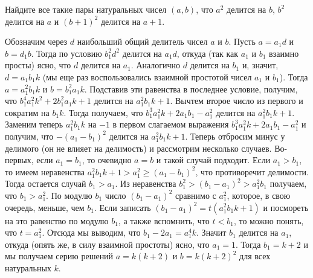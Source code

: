 Найдите все такие пары натуральных чисел $(a, b)$, что
$a^2$ делится на $b$,
$b^2$ делится на $a$
и $(b + 1)^2$ делится на $a + 1$.

\solution
Обозначим через $d$ наибольший общий делитель чисел $a$ и $b$.
Пусть $a = a_1 d$ и $b = d_1 b$.
Тогда по условию $b_1^2 d^2$ делится на $a_1 d$, откуда
(так как $a_1$ и $b_1$ взаимно просты)
ясно, что $d$ делится на $a_1$.
Аналогично $d$ делится на $b_1$ и, значит, $d = a_1 b_1 k$
(мы еще раз воспользовались взаимной простотой чисел $a_1$ и $b_1$).
Тогда $a = a_1^2 b_1 k$ и $b = b_1^2 a_1 k$.
Подставив эти равенства в последнее условие, получим, что
$b_1^4 a_1^2 k^2 + 2 b_1^2 a_1 k + 1$
делится на $a_1^2 b_1 k + 1$.
Вычтем второе число из первого и сократим на $b_1 k$.
Тогда получаем, что
$b_1^3 a_1^2 k + 2 a_1 b_1 - a_1^2$
делится на $a_1^2 b_1 k + 1$.
Заменим теперь $a_1^2 b_1 k$ на $-1$ в первом слагаемом выражения
$b_1^3 a_1^2 k + 2 a_1 b_1 - a_1^2$ и получим, что $-(a_1 - b_1)^2$ делится на
$a_1^2 b_1 k + 1$.
Теперь отбросим минус у делимого (он не влияет на делимость) и рассмотрим
несколько случаев.
Во-первых, если $a_1 = b_1$, то очевидно $a = b$ и такой случай подходит.
Если $a_1 > b_1$, то имеем неравенства
$a_1^2 b_1 k + 1 > a_1^2 \geq (a_1 - b_1)^2$,
что противоречит делимости.
Тогда остается случай $b_1 > a_1$.
Из неравенства
$b_1^2 > (b_1 - a_1)^2 > a_1^2 b_1$
получаем, что $b_1 > a_1^2$.
По модулю $b_1$ число $(b_1 - a_1)^2$ сравнимо с $a_1^2$,
которое, в свою очередь, меньше, чем $b_1$.
Если записать
$(b_1 - a_1)^2 = t (a_1^2 b_1 k+1)$ и посмореть на это равенство
по модулю $b_1$, а также вспомнить, что $t < b_1$, то можно понять, что
$t = a_1^2$.
Отсюда мы выводим, что $b_1 - 2 a_1 = a_1^4 k$.
Значит $b_1$ делится на $a_1$, откуда (опять же, в силу взаимной простоты)
ясно, что $a_1 = 1$.
Тогда $b_1 = k + 2$ и мы получаем серию решений
$a = k (k + 2)$ и $b = k (k + 2)^2$ для всех натуральных $k$. 

